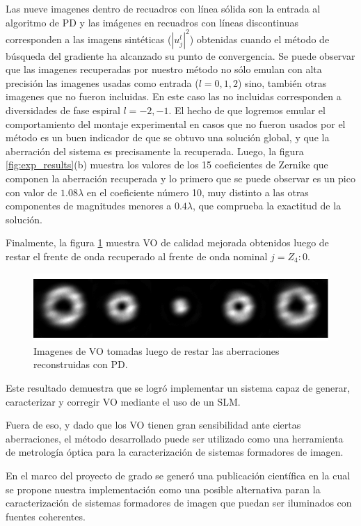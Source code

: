 Las nueve imagenes dentro de recuadros con línea sólida son la
entrada al algoritmo de PD y las imágenes en recuadros con líneas
discontinuas corresponden a las imagens sintéticas ($|u_j^l|^2$) obtenidas
cuando el método de búsqueda del gradiente ha alcanzado su punto de 
convergencia. Se puede observar que las imagenes
recuperadas por nuestro método no sólo emulan con alta precisión las
imagenes usadas como entrada ($l=0,1,2$) sino, también otras imagenes que no
fueron incluidas. En este caso las no incluidas corresponden a
diversidades de fase espiral $l=-2,-1$. El hecho de que logremos emular el comportamiento
del montaje experimental en casos que no fueron usados por el método
es un buen indicador de que se obtuvo una solución global, y que la
aberración del sistema es precisamente la recuperada. Luego, la figura
\ref{fig:exp_results}(b) muestra los valores de los 15 coeficientes de
Zernike que componen la aberración recuperada y lo primero que se puede
observar es un pico con valor de  $1.08\lambda$ en el coeficiente
número 10, muy distinto a las otras componentes de magnitudes menores
a $0.4\lambda$, que comprueba la exactitud de la solución.   

Finalmente, la figura \ref{fig:exp_correction} muestra VO de calidad mejorada obtenidos
luego de restar el frente de onda recuperado al frente de
onda nominal $j = Z_4:0$.  

\begin{figure}[h!]
\centering
\includegraphics[scale=1.5]{PSF_comparison_experimental_results_07032015.pdf}
\caption[VO registrados luego restar las aberraciones detectadas
  con PD.]{Imagenes de VO tomadas luego de restar las aberraciones
    reconstruidas con PD.}  
\label{fig:exp_correction}
\end{figure}

Este resultado demuestra que se logró implementar un sistema capaz de
generar, caracterizar y corregir VO mediante el uso de un SLM. 

Fuera de eso, y dado que los VO tienen gran sensibilidad ante ciertas
aberraciones, el método desarrollado puede ser utilizado como una
herramienta de metrología óptica para la caracterización de sistemas
formadores de imagen. 

En el marco del proyecto de grado se generó una
publicación científica en la cual se propone nuestra implementación
como una posible alternativa paran la caracterización de sistemas
formadores de imagen que puedan ser iluminados con fuentes
coherentes. 

\newpage
\pagebreak[4]

